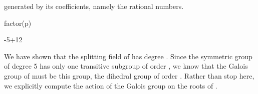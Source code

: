 {{{{{{{{{{{{{{{{{{\begin{xtc}
\begin{xtccomment}
generated by its coefficients, namely the rational numbers.
\end{xtccomment}
\begin{spadsrc}
factor(p) 
\end{spadsrc}
\begin{TeXOutput}
\begin{fricasmath}{9}
-{5\TIMES {}}+12%
\end{fricasmath}
\end{TeXOutput}
\end{xtc}
%
We have shown that the splitting field of  has degree
.
Since the symmetric group of degree 5 has only one transitive subgroup
of order , we know that the Galois group of  must be
this group, the dihedral group
of order .
Rather than stop here, we explicitly compute the action of the Galois
group on the roots of .

}}}}}}}}}}}}}}}}}}
